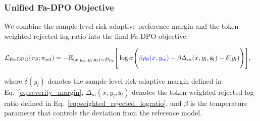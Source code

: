 \documentclass[a4paper,fleqn,doubleblind]{cas-sc}
\begin{document}
\subsubsection{Unified Fa-DPO Objective}

We combine the sample-level risk-adaptive preference margin and the token-weighted rejected log-ratio into the final Fa-DPO objective:

\begin{equation}
\label{eq:fa_dpo}
\begin{split}
\mathcal{L}_{\text{Fa-DPO}}(\pi_\theta; \pi_{\text{ref}})
&= -\mathbb{E}_{(x, y_w, y_l, \mathbf{s}_l) \sim \mathcal{D}_{\text{Fa}}} \Bigg[
\log \sigma \Bigg(
{\color{blue}\beta \rho_\theta(x,y_w)}
- \beta \Delta_m(x,y_l,\mathbf{s}_l)
- \delta(y_l)
\Bigg) \Bigg],
\end{split}
\end{equation}

where $\delta(y_l)$ denotes the sample-level risk-adaptive margin defined in Eq.~\ref{eq:severity_margin},
$\Delta_m(x,y_l,\mathbf{s}_l)$ denotes the token-weighted rejected log-ratio defined in Eq.~\ref{eq:weighted_rejected_logratio},
and $\beta$ is the temperature parameter that controls the deviation from the reference model.
\end{document}
